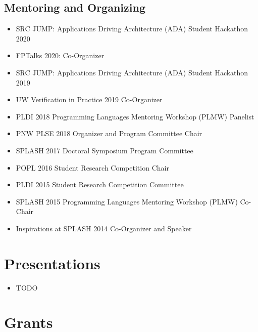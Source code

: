 \documentclass[10pt]{article}
\begin{document}
\subsection*{Mentoring and Organizing}

\begin{itemize}
  \item SRC JUMP: Applications Driving Architecture (ADA) Student Hackathon 2020
  \item FPTalks 2020: Co-Organizer
  \item SRC JUMP: Applications Driving Architecture (ADA) Student Hackathon 2019
  \item UW Verification in Practice 2019 Co-Organizer
  \item PLDI 2018 Programming Languages Mentoring Workshop (PLMW) Panelist
  \item PNW PLSE 2018 Organizer and Program Committee Chair
  \item SPLASH 2017 Doctoral Symposium Program Committee
  \item POPL 2016 Student Research Competition Chair
  \item PLDI 2015 Student Research Competition Committee
  \item SPLASH 2015 Programming Languages Mentoring Workshop (PLMW) Co-Chair
  \item Inspirations at SPLASH 2014 Co-Organizer and Speaker
\end{itemize}

\section*{Presentations}

\begin{itemize}
  \item TODO
\end{itemize}

\section*{Grants}
\end{document}
